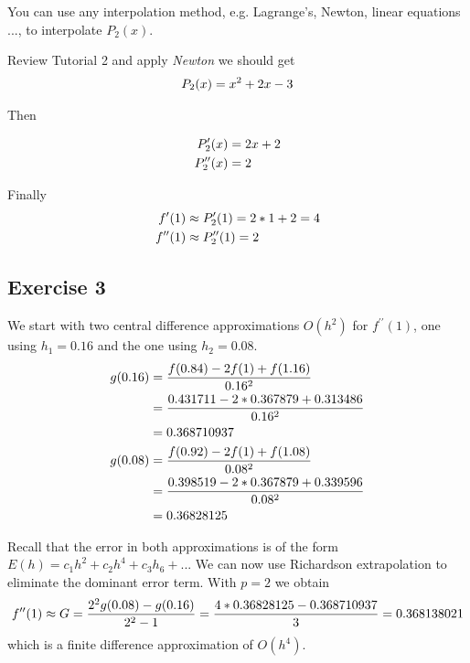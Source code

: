 \documentclass[12pt]{article}
\begin{document}
You can use any interpolation method, e.g. Lagrange's, Newton, linear equations ..., to interpolate $P_2(x)$.

Review Tutorial 2 and apply \textit{Newton} we should get
\begin{align}
P_2(x)= x^2 + 2x -3 \notag
\end{align}

Then

\begin{align}
P^\prime_2(x)&= 2x+2 \notag \\
P^{\prime\prime}_2(x)&= 2 \notag
\end{align}


Finally
\begin{align}
f^\prime(1) &\approx P^\prime_2(1)= 2*1+2 = 4 \notag \\
f^{\prime\prime}(1)& \approx P^{\prime\prime}_2(1)= 2 \notag
\end{align}

\subsection{Exercise 3}

We start with two central difference approximations $O(h^2)$ for $f^{\prime \prime}(1)$, one using $h_1=0.16$ and the one using $h_2=0.08$.
\begin{align}
g(0.16)&=\frac{f(0.84) - 2f(1)+f(1.16)}{0.16^2} \notag \\
			&=\frac{0.431711 - 2*0.367879+0.313486}{0.16^2} \notag \\
            &=0.368710937 \notag \\
g(0.08)&=\frac{f(0.92) - 2f(1)+f(1.08)}{0.08^2} \notag \\
			&=\frac{0.398519 - 2*0.367879+0.339596}{0.08^2} \notag \\
            &=0.36828125 \notag
\end{align}

Recall that the error in both approximations is of the form \(E(h) = c_1h^2 + c_2h^4+c_3h_6 +...\) We can now use Richardson extrapolation to eliminate the dominant error term. With $p = 2$ we obtain
\begin{align}
f^{\prime \prime}(1) \approx G = \frac{2^2g(0.08)-g(0.16)}{2^2-1} = \frac{4*0.36828125-0.368710937}{3}
= 0.368138021 \notag
\end{align}
which is a finite difference approximation of \(O(h^4)\).
\end{document}
